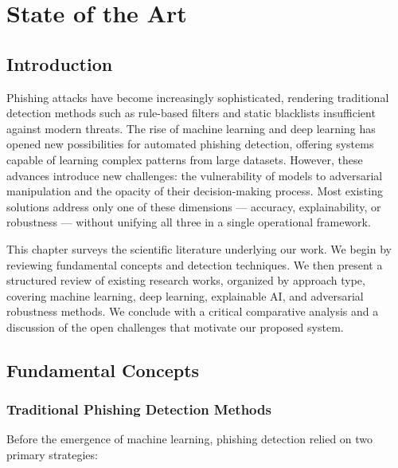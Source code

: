 \chapter{State of the Art}
\vspace{0.5cm}
\minitoc
\vspace{1cm}

\section*{Introduction}

Phishing attacks have become increasingly sophisticated, rendering traditional detection methods such as rule-based filters and static blacklists insufficient against modern threats. The rise of machine learning and deep learning has opened new possibilities for automated phishing detection, offering systems capable of learning complex patterns from large datasets. However, these advances introduce new challenges: the vulnerability of models to adversarial manipulation and the opacity of their decision-making process. Most existing solutions address only one of these dimensions — accuracy, explainability, or robustness — without unifying all three in a single operational framework.

This chapter surveys the scientific literature underlying our work. We begin by reviewing fundamental concepts and detection techniques. We then present a structured review of existing research works, organized by approach type, covering machine learning, deep learning, explainable AI, and adversarial robustness methods. We conclude with a critical comparative analysis and a discussion of the open challenges that motivate our proposed system.

\section{Fundamental Concepts}

\subsection{Traditional Phishing Detection Methods}

Before the emergence of machine learning, phishing detection relied on two primary strategies:

